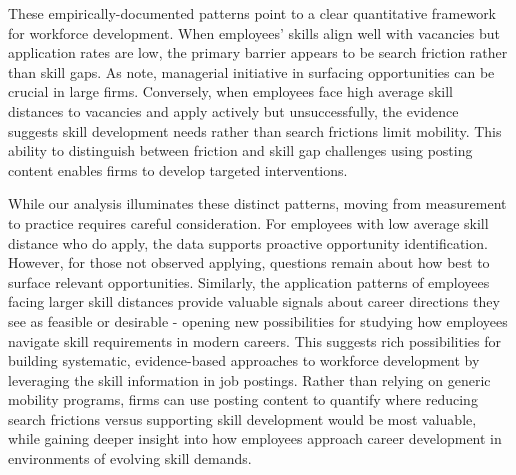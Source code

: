 These empirically-documented patterns point to a clear quantitative framework for workforce development. When employees' 
skills align well with vacancies but application rates are low, the primary barrier appears to be search friction rather 
than skill gaps. As \citet{invisiblehand} note, managerial initiative in surfacing opportunities can be crucial in 
large firms. Conversely, when employees face high average skill distances to vacancies and apply actively but unsuccessfully, 
the evidence suggests skill development needs rather than search frictions limit mobility. This ability to distinguish 
between friction and skill gap challenges using posting content enables firms to develop targeted interventions.

While our analysis illuminates these distinct patterns, moving from measurement to practice requires careful consideration. 
For employees with low average skill distance who do apply, the data supports proactive opportunity identification. 
However, for those not observed applying, questions remain about how best to surface relevant opportunities. Similarly, 
the application patterns of employees facing larger skill distances provide valuable signals about career directions 
they see as feasible or desirable - opening new possibilities for studying how employees navigate skill requirements 
in modern careers. This suggests rich possibilities for building systematic, evidence-based approaches to workforce 
development by leveraging the skill information in job postings. Rather than relying on generic mobility programs, 
firms can use posting content to quantify where reducing search frictions versus supporting skill development would 
be most valuable, while gaining deeper insight into how employees approach career development in environments of 
evolving skill demands.


